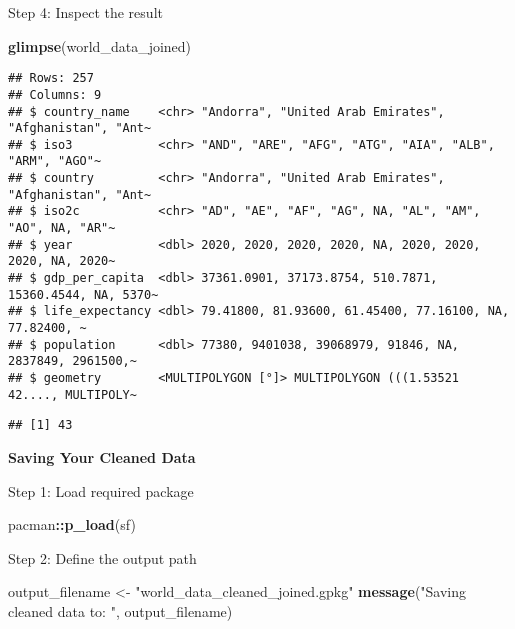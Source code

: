 \documentclass[
]{article}
\newenvironment{Shaded}{\begin{snugshade}}{\end{snugshade}}
\newcommand{\FunctionTok}[1]{\textcolor[rgb]{0.13,0.29,0.53}{\textbf{#1}}}
\newcommand{\NormalTok}[1]{#1}
\newcommand{\OtherTok}[1]{\textcolor[rgb]{0.56,0.35,0.01}{#1}}
\newcommand{\SpecialCharTok}[1]{\textcolor[rgb]{0.81,0.36,0.00}{\textbf{#1}}}
\newcommand{\StringTok}[1]{\textcolor[rgb]{0.31,0.60,0.02}{#1}}
\begin{document}
Step 4: Inspect the result

\begin{Shaded}
\begin{Highlighting}[]
\FunctionTok{glimpse}\NormalTok{(world\_data\_joined)}
\end{Highlighting}
\end{Shaded}

\begin{verbatim}
## Rows: 257
## Columns: 9
## $ country_name    <chr> "Andorra", "United Arab Emirates", "Afghanistan", "Ant~
## $ iso3            <chr> "AND", "ARE", "AFG", "ATG", "AIA", "ALB", "ARM", "AGO"~
## $ country         <chr> "Andorra", "United Arab Emirates", "Afghanistan", "Ant~
## $ iso2c           <chr> "AD", "AE", "AF", "AG", NA, "AL", "AM", "AO", NA, "AR"~
## $ year            <dbl> 2020, 2020, 2020, 2020, NA, 2020, 2020, 2020, NA, 2020~
## $ gdp_per_capita  <dbl> 37361.0901, 37173.8754, 510.7871, 15360.4544, NA, 5370~
## $ life_expectancy <dbl> 79.41800, 81.93600, 61.45400, 77.16100, NA, 77.82400, ~
## $ population      <dbl> 77380, 9401038, 39068979, 91846, NA, 2837849, 2961500,~
## $ geometry        <MULTIPOLYGON [°]> MULTIPOLYGON (((1.53521 42...., MULTIPOLY~
\end{verbatim}

\begin{Shaded}
\end{Shaded}

\begin{verbatim}
## [1] 43
\end{verbatim}

\textbf{Saving Your Cleaned Data}

Step 1: Load required package

\begin{Shaded}
\begin{Highlighting}[]
\NormalTok{pacman}\SpecialCharTok{::}\FunctionTok{p\_load}\NormalTok{(sf)}
\end{Highlighting}
\end{Shaded}

Step 2: Define the output path

\begin{Shaded}
\begin{Highlighting}[]
\NormalTok{output\_filename }\OtherTok{\textless{}{-}} \StringTok{"world\_data\_cleaned\_joined.gpkg"}
\FunctionTok{message}\NormalTok{(}\StringTok{"Saving cleaned data to: "}\NormalTok{, output\_filename)}
\end{Highlighting}
\end{Shaded}
\end{document}
